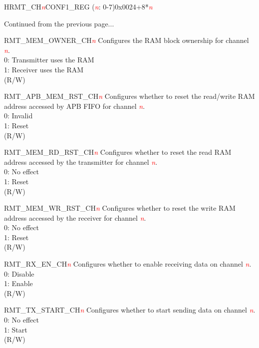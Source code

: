 \begin{register}{H}{RMT\_CH\textcolor{red}{\it{n}}CONF1\_REG (\textcolor{red}{\it{n}}: 0-7)}{0x0024+8*\textcolor{red}{\it{n}}}
\begin{regdesc}\begin{reglist}
\item [Continued from the previous page...]

\item [RMT\_MEM\_OWNER\_CH\textcolor{red}{\it{n}}] Configures the RAM block ownership for channel \textcolor{red}{\it{n}}.\\
0: Transmitter uses the RAM\\
1: Receiver uses the RAM\\ (R/W)
\item [RMT\_APB\_MEM\_RST\_CH\textcolor{red}{\it{n}}] Configures whether to reset the read/write RAM address accessed by APB FIFO for channel \textcolor{red}{\it{n}}.\\
0: Invalid\\
1: Reset\\ (R/W)
\item [RMT\_MEM\_RD\_RST\_CH\textcolor{red}{\it{n}}] Configures whether to reset the read RAM address accessed by the transmitter for channel \textcolor{red}{\it{n}}.\\
0: No effect\\
1: Reset\\ (R/W)
\item [RMT\_MEM\_WR\_RST\_CH\textcolor{red}{\it{n}}] Configures whether to reset the write RAM address accessed by the receiver for channel \textcolor{red}{\it{n}}.\\
0: No effect\\
1: Reset\\ (R/W)
\item [RMT\_RX\_EN\_CH\textcolor{red}{\it{n}}] Configures whether to enable receiving data on channel \textcolor{red}{\it{n}}.\\
0: Disable\\
1: Enable\\ (R/W)
\item [RMT\_TX\_START\_CH\textcolor{red}{\it{n}}] Configures whether to start sending data on channel \textcolor{red}{\it{n}}.\\
0: No effect\\
1: Start\\ (R/W)
\end{reglist}\end{regdesc}
\end{register}


